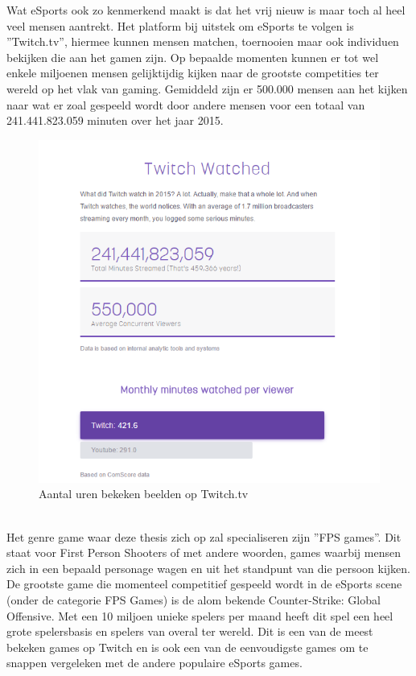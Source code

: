 \documentclass[pdftex,a4paper,12pt,twoside]{report}
\begin{document}
Wat eSports ook zo kenmerkend maakt is dat het vrij nieuw is maar toch al heel veel mensen aantrekt. Het platform bij uitstek om eSports te volgen is ''Twitch.tv'', hiermee kunnen mensen matchen, toernooien maar ook individuen bekijken die aan het gamen zijn. Op bepaalde momenten kunnen er tot wel enkele miljoenen mensen gelijktijdig kijken naar de grootste competities ter wereld op het vlak van gaming. Gemiddeld zijn er 500.000 mensen aan het kijken naar wat er zoal gespeeld wordt door andere mensen voor een totaal van 241.441.823.059 minuten over het jaar 2015. \citep{twitchinfographic}
\begin{figure}[!h]
\centering
\includegraphics[width=15cm]{img/TwitchInfographic}
\caption{Aantal uren bekeken beelden op Twitch.tv}
\end{figure}  
\\

Het genre game waar deze thesis zich op zal specialiseren zijn ''FPS games''. Dit staat voor First Person Shooters of met andere woorden, games waarbij mensen zich in een bepaald personage wagen en uit het standpunt van die persoon kijken. De grootste game die momenteel competitief gespeeld wordt in de eSports scene (onder de categorie FPS Games) is de alom bekende Counter-Strike: Global Offensive. 
 Met een 10 miljoen unieke spelers per maand heeft dit spel een heel grote spelersbasis en spelers van overal ter wereld. Dit is een van de meest bekeken games op Twitch en is ook een van de eenvoudigste games om te snappen vergeleken met de andere populaire eSports games. \citep{csgoblog}
\\
\end{document}
